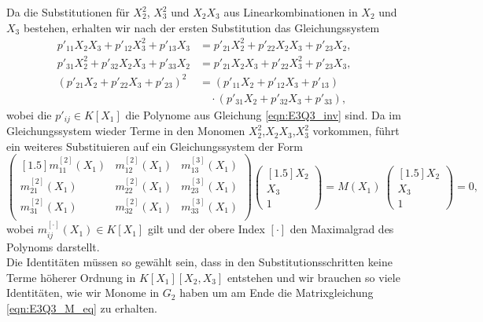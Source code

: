 \documentclass[a4paper,oneside, 11pt, openany%
]{article}
\theoremstyle{custom}
\theoremstyle{custom}
\begin{document}
	Da die Substitutionen für $X_{2}^2$, $X_{3}^2$ und $X_{2}X_{3}$ aus Linearkombinationen in $X_{2}$ und $X_{3}$ bestehen, erhalten wir nach der ersten Substitution das Gleichungssystem
	\begin{equation}
		\begin{alignedat}{1}
			p'_{11}X_{2}X_{3}+p'_{12}X_{3}^2+p'_{13}X_{3}&=p'_{21}X_{2}^2+p'_{22}X_{2}X_{3}+p'_{23}X_{2},\\
			p'_{31}X_{2}^2+p'_{32}X_{2}X_{3}+p'_{33}X_{2}&=p'_{21}X_{2}X_{3}+p'_{22}X_{3}^2+p'_{23}X_{3},\\
			\left(p'_{21}X_{2}+p'_{22}X_{3}+p'_{23}\right)^2&=\left( p'_{11}X_{2}+p'_{12}X_{3}+p'_{13}\right)\\ & \quad \cdot \left( p'_{31}X_{2}+p'_{32}X_{3}+p'_{33}\right),
		\end{alignedat}
	\end{equation}
	wobei die $p'_{ij} \in K[X_{1}]$ die Polynome aus Gleichung \eqref{eqn:E3Q3_inv} sind.
	Da im Gleichungssystem wieder Terme in den Monomen $X_{2}^2$,$X_{2}X_{3}$,$X_{3}^2$ vorkommen,
	führt ein weiteres Substituieren auf ein Gleichungssystem der Form
	\begin{equation}\label{eqn:E3Q3_M_eq}
		\begin{pmatrix}[1.5]
			m_{11}^{\left[ 2\right]}\left( X_{1}\right) & m_{12}^{\left[ 2\right]}\left( X_{1}\right) & m_{13}^{\left[ 3\right]}\left( X_{1}\right) \\
			m_{21}^{\left[ 2\right]}\left( X_{1}\right) & m_{22}^{\left[ 2\right]}\left( X_{1}\right) & m_{23}^{\left[ 3\right]}\left( X_{1}\right) \\
			m_{31}^{\left[ 2\right]}\left( X_{1}\right) & m_{32}^{\left[ 2\right]}\left( X_{1}\right) & m_{33}^{\left[ 3\right]}\left( X_{1}\right) \\
		\end{pmatrix}
		\begin{pmatrix}[1.5]
			X_{2}\\
			X_{3}\\
			1
		\end{pmatrix}
		= M\left( X_{1}\right) \ \begin{pmatrix}[1.5]
			X_{2}\\
			X_{3}\\
			1
		\end{pmatrix}
		=0,
	\end{equation}
	wobei $m_{ij}^{\left[\cdot \right] }\left(X_{1}\right) \in K\left[ X_{1}\right]$ gilt und der obere Index $\left[\cdot \right]$ den Maximalgrad des Polynoms darstellt.\\
	Die Identitäten müssen so gewählt sein, dass in den Substitutionsschritten keine Terme höherer Ordnung in $K[X_1][X_2,X_3]$ entstehen und wir brauchen so viele Identitäten, wie wir Monome in $G_2$ haben um am Ende die Matrixgleichung \eqref{eqn:E3Q3_M_eq} zu erhalten.
	
\end{document}
